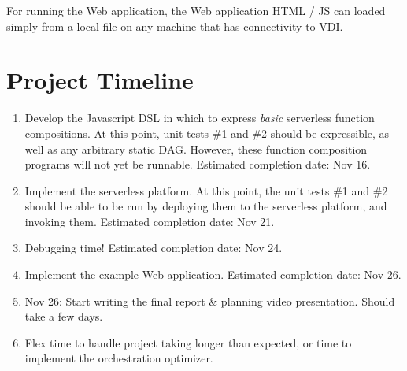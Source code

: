 \documentclass[12pt]{article}
\begin{document}
For running the Web application, the Web application HTML / JS
can loaded simply from a local file on any machine that has
connectivity to VDI.

\section{Project Timeline}

\begin{enumerate}
  \item Develop the Javascript DSL in which to express \emph{basic}
  serverless function compositions. At this point, unit tests 
  \#1 and \#2 should be expressible, as well as any arbitrary
  static DAG. However, these function composition programs
  will not yet be runnable. Estimated completion date: Nov 16.
  \item Implement the serverless platform. At this point, the
  unit tests \#1 and \#2 should be able to be run by deploying
  them to the serverless platform, and invoking them. Estimated completion date: Nov 21.
  \item Debugging time! Estimated completion date: Nov 24.
  \item Implement the example Web application. Estimated completion date: Nov 26.
  \item Nov 26: Start writing the final report \& planning video presentation. Should take a few days.
  \item Flex time to handle project taking longer than expected, or time
  to implement the orchestration optimizer.
\end{enumerate}



% 


\end{document}
